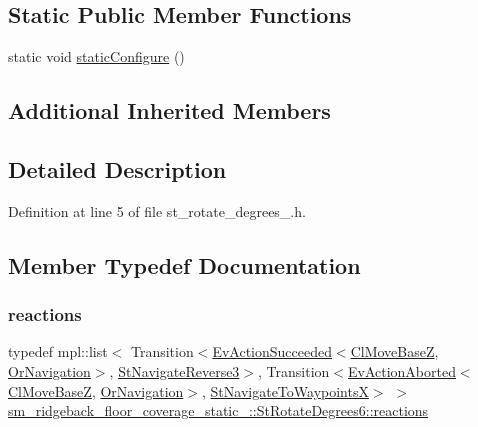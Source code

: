 \subsection*{Static Public Member Functions}
\begin{DoxyCompactItemize}
\item 
static void \hyperlink{structsm__ridgeback__floor__coverage__static__1_1_1StRotateDegrees6_a34cbdecca81ee8ab657be8af208da167}{static\+Configure} ()
\end{DoxyCompactItemize}
\subsection*{Additional Inherited Members}


\subsection{Detailed Description}


Definition at line 5 of file st\+\_\+rotate\+\_\+degrees\+\_.\+h.



\subsection{Member Typedef Documentation}
\mbox{\label{structsm__ridgeback__floor__coverage__static__1_1_1StRotateDegrees6_a1babbb0b73ffae64e466e28fddbde49d}} 
\subsubsection{\texorpdfstring{reactions}{reactions}}
{\footnotesize\ttfamily typedef mpl\+::list$<$ Transition$<$\hyperlink{structsmacc_1_1default__events_1_1EvActionSucceeded}{Ev\+Action\+Succeeded}$<$\hyperlink{classcl__move__base__z_1_1ClMoveBaseZ}{Cl\+Move\+BaseZ}, \hyperlink{classsm__ridgeback__floor__coverage__static__1_1_1OrNavigation}{Or\+Navigation}$>$, \hyperlink{structsm__ridgeback__floor__coverage__static__1_1_1StNavigateReverse3}{St\+Navigate\+Reverse3}$>$, Transition$<$\hyperlink{structsmacc_1_1default__events_1_1EvActionAborted}{Ev\+Action\+Aborted}$<$\hyperlink{classcl__move__base__z_1_1ClMoveBaseZ}{Cl\+Move\+BaseZ}, \hyperlink{classsm__ridgeback__floor__coverage__static__1_1_1OrNavigation}{Or\+Navigation}$>$, \hyperlink{structsm__ridgeback__floor__coverage__static__1_1_1StNavigateToWaypointsX}{St\+Navigate\+To\+WaypointsX}$>$ $>$ \hyperlink{structsm__ridgeback__floor__coverage__static__1_1_1StRotateDegrees6_a1babbb0b73ffae64e466e28fddbde49d}{sm\+\_\+ridgeback\+\_\+floor\+\_\+coverage\+\_\+static\+\_\+::\+St\+Rotate\+Degrees6\+::reactions}}



